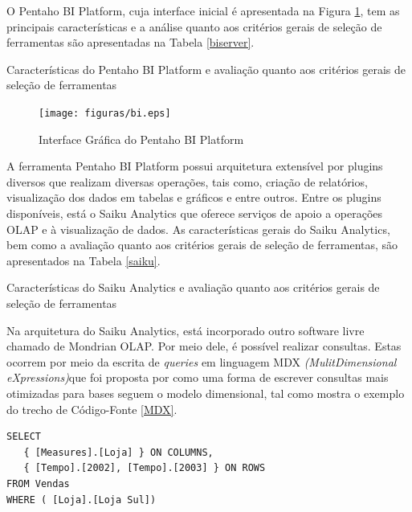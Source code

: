 O Pentaho BI Platform, cuja interface inicial é apresentada na Figura \ref{BIplatform}, tem as principais características e a análise quanto aos critérios gerais de seleção de ferramentas são apresentadas na Tabela \ref{biserver}. 


\begin{table}[!ht]

\caption{Características do Pentaho BI Platform e avaliação quanto aos critérios gerais de seleção de ferramentas}
\label{biserver}
\end{table}
\FloatBarrier



\begin{figure}[ht!]
\begin{center}
\texttt{[image: figuras/bi.eps]}
\caption{Interface Gráfica do Pentaho BI Platform}
\label{BIplatform}
\end{center}
\end{figure}
\FloatBarrier
 

A ferramenta Pentaho BI Platform possui arquitetura extensível por plugins diversos que realizam diversas operações, tais como, criação de relatórios, visualização dos dados em tabelas e gráficos e entre outros. Entre os plugins disponíveis, está o Saiku Analytics que oferece serviços de apoio a operações OLAP e à visualização de dados. As características gerais do Saiku Analytics, bem como a avaliação quanto aos critérios gerais de seleção de ferramentas, são apresentados na Tabela \ref{saiku}. 

\begin{table}[!ht]

\caption{Características do Saiku Analytics e avaliação quanto aos critérios gerais de seleção de ferramentas}
\label{saiku}
\end{table}
\FloatBarrier

Na arquitetura do Saiku Analytics, está incorporado outro software livre chamado de Mondrian OLAP. Por meio dele, é possível realizar  consultas. Estas ocorrem por meio da escrita de \textit{queries} em linguagem MDX \textit{(MulitDimensional eXpressions)}que foi proposta por  como uma forma de escrever consultas mais otimizadas para bases seguem o modelo dimensional, tal como mostra o exemplo do trecho de Código-Fonte \ref{MDX}.


\begin{center}
\begin{minipage}{0.5\textwidth}

\begin{lstlisting}[caption=Exemplo de \textit{Query} em linguagem MDX, label=MDX]
 SELECT
   { [Measures].[Loja] } ON COLUMNS,
   { [Tempo].[2002], [Tempo].[2003] } ON ROWS
FROM Vendas
WHERE ( [Loja].[Loja Sul]) 

\end{lstlisting}
\end{minipage}
\end{center}
\FloatBarrier

